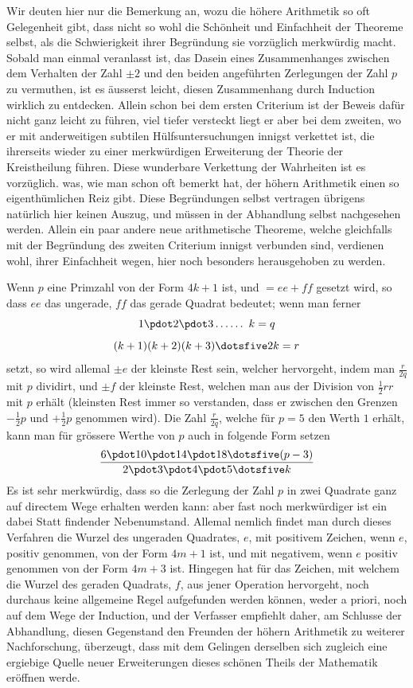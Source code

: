 Wir deuten hier nur die Bemerkung an, wozu die höhere Arithmetik so oft Gelegenheit gibt, dass nicht so wohl die Schönheit und Einfachheit der Theoreme selbst, als die Schwierigkeit ihrer Begründung sie vorzüglich merkwürdig macht. Sobald man einmal veranlasst ist, das Dasein eines Zusammenhanges zwischen dem Verhalten der Zahl $\pm2$ und den beiden angeführten Zerlegungen der Zahl $p$ zu vermuthen, ist es äusserst leicht, diesen Zusammenhang durch Induction wirklich zu entdecken. Allein schon bei dem ersten Criterium ist der Beweis dafür nicht ganz leicht zu führen, viel tiefer versteckt liegt er aber bei dem zweiten, wo er mit anderweitigen subtilen Hülfsuntersuchungen innigst verkettet ist, die ihrerseits wieder zu einer merkwürdigen Erweiterung der Theorie der Kreistheilung führen. Diese wunderbare Verkettung der Wahrheiten ist es vorzüglich. was, wie man schon oft bemerkt hat, der höhern Arithmetik einen so eigenthümlichen Reiz gibt. Diese Begründungen selbst vertragen übrigens natürlich hier keinen Auszug, und müssen in der Abhandlung selbst nachgesehen werden. Allein ein paar andere neue arithmetische Theoreme, welche gleichfalls mit der Begründung des zweiten Criterium innigst verbunden sind, verdienen wohl, ihrer Einfachheit wegen, hier noch besonders herausgehoben zu werden.

Wenn $p$ eine Primzahl von der Form $4k+1$ ist, und $=ee+ff$ 
%
gesetzt wird, so dass $ee$ das ungerade, $ff$ das gerade Quadrat bedeutet; wenn man ferner
\[
1\pdot2\pdot3\mathinner{.\,.\,.\,.\,.\,.}\ k=q
\]
\[
(k+1)(k+2)(k+3)\dotsfive2k=r
\]
setzt, so wird allemal $\pm e$ der kleinste Rest sein, welcher hervorgeht, indem man $\frac r{2q}$ mit $p$ dividirt, und $\pm f$ der kleinste Rest, welchen man aus der Division von $\frac12rr$ mit $p$ erhält (kleinsten Rest immer so verstanden, dass er zwischen den Grenzen $-\frac12p$ und $+\frac12p$ genommen wird). Die Zahl $\frac r{2q}$, welche für $p=5$ den Werth $1$ erhält, kann man für grössere Werthe von $p$ auch in folgende Form setzen
\[
\frac{6\pdot10\pdot14\pdot18\dotsfive(p-3)}{2\pdot3\pdot4\pdot5\dotsfive k}
\]
Es ist sehr merkwürdig, dass so die Zerlegung der Zahl $p$ in zwei Quadrate ganz auf directem Wege erhalten werden kann: aber fast noch merkwürdiger ist ein dabei Statt findender Nebenumstand. Allemal nemlich findet man durch dieses Verfahren die Wurzel des ungeraden Quadrates, $e$, mit positivem Zeichen, wenn $e$, positiv genommen, von der Form $4m+1$ ist, und mit negativem, wenn $e$ positiv genommen von der Form $4m+3$ ist. Hingegen hat für das Zeichen, mit welchem die Wurzel des geraden Quadrats, $f$, aus jener Operation hervorgeht, noch durchaus keine allgemeine Regel aufgefunden werden können, weder a priori, noch auf dem Wege der Induction, und der Verfasser empfiehlt daher, am Schlusse der Abhandlung, diesen Gegenstand den Freunden der höhern Arithmetik zu weiterer Nachforschung, überzeugt, dass mit dem Gelingen derselben sich zugleich eine ergiebige Quelle neuer Erweiterungen dieses schönen Theils der Mathematik eröffnen werde.
